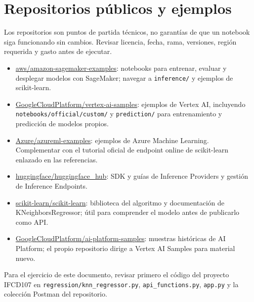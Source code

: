 \documentclass[11pt,a4paper]{article}
\begin{document}
\section{Repositorios públicos y ejemplos}
Los repositorios son puntos de partida técnicos, no garantías de que un notebook siga funcionando sin cambios. Revisar licencia, fecha, rama, versiones, región requerida y gasto antes de ejecutar.
\begin{itemize}
  \item \href{https://github.com/aws/amazon-sagemaker-examples}{aws/amazon-sagemaker-examples}: notebooks para entrenar, evaluar y desplegar modelos con SageMaker; navegar a \texttt{inference/} y ejemplos de scikit-learn.
  \item \href{https://github.com/GoogleCloudPlatform/vertex-ai-samples}{GoogleCloudPlatform/vertex-ai-samples}: ejemplos de Vertex AI, incluyendo \texttt{notebooks/official/custom/} y \texttt{prediction/} para entrenamiento y predicción de modelos propios.
  \item \href{https://github.com/Azure/azureml-examples}{Azure/azureml-examples}: ejemplos de Azure Machine Learning. Complementar con el tutorial oficial de endpoint online de scikit-learn enlazado en las referencias.
  \item \href{https://github.com/huggingface/huggingface_hub}{huggingface/huggingface\_hub}: SDK y guías de Inference Providers y gestión de Inference Endpoints.
  \item \href{https://github.com/scikit-learn/scikit-learn}{scikit-learn/scikit-learn}: biblioteca del algoritmo y documentación de KNeighborsRegressor; útil para comprender el modelo antes de publicarlo como API.
  \item \href{https://github.com/GoogleCloudPlatform/ai-platform-samples}{GoogleCloudPlatform/ai-platform-samples}: muestras históricas de AI Platform; el propio repositorio dirige a Vertex AI Samples para material nuevo.
\end{itemize}
Para el ejercicio de este documento, revisar primero el código del proyecto IFCD107 en \texttt{regression/knn\_regressor.py}, \texttt{api\_functions.py}, \texttt{app.py} y la colección Postman del repositorio.
\end{document}
